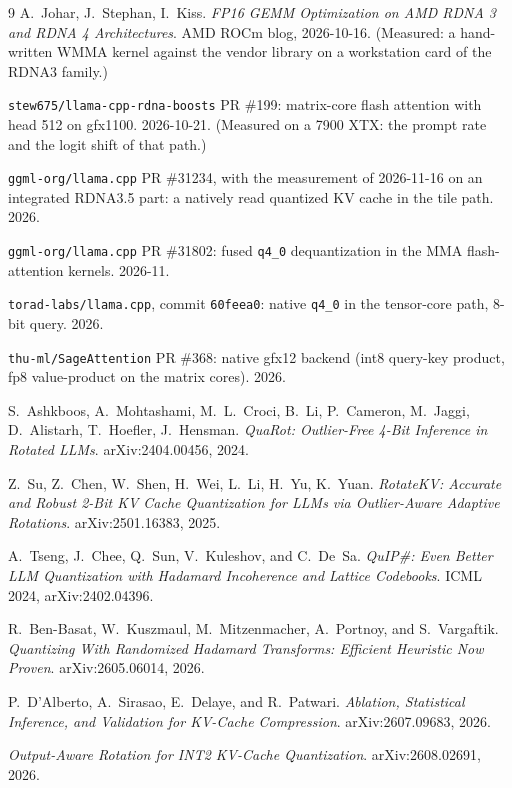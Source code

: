 \documentclass[10pt,twocolumn]{article}
\begin{document}
\begin{thebibliography}{9}
A.~Johar, J.~Stephan, I.~Kiss.
\emph{FP16 GEMM Optimization on AMD RDNA 3 and RDNA 4 Architectures}.
AMD ROCm blog, 2026-10-16. (Measured: a hand-written WMMA kernel against the vendor library on a
workstation card of the RDNA3 family.)

\texttt{stew675/llama-cpp-rdna-boosts} PR \#199: matrix-core flash attention with head 512 on gfx1100.
2026-10-21. (Measured on a 7900 XTX: the prompt rate and the logit shift of that path.)

\texttt{ggml-org/llama.cpp} PR \#31234, with the measurement of 2026-11-16 on an integrated RDNA3.5 part:
a natively read quantized KV cache in the tile path. 2026.


\texttt{ggml-org/llama.cpp} PR \#31802: fused \texttt{q4\_0} dequantization in the MMA
flash-attention kernels. 2026-11.

\texttt{torad-labs/llama.cpp}, commit \texttt{60feea0}: native \texttt{q4\_0} in the
tensor-core path, 8-bit query. 2026.

\texttt{thu-ml/SageAttention} PR \#368: native gfx12 backend (int8 query-key product,
fp8 value-product on the matrix cores). 2026.

S.~Ashkboos, A.~Mohtashami, M.~L.~Croci, B.~Li, P.~Cameron, M.~Jaggi, D.~Alistarh, T.~Hoefler, J.~Hensman.
\emph{QuaRot: Outlier-Free 4-Bit Inference in Rotated LLMs}.
arXiv:2404.00456, 2024.

Z.~Su, Z.~Chen, W.~Shen, H.~Wei, L.~Li, H.~Yu, K.~Yuan.
\emph{RotateKV: Accurate and Robust 2-Bit KV Cache Quantization for LLMs via Outlier-Aware Adaptive Rotations}.
arXiv:2501.16383, 2025.

A.~Tseng, J.~Chee, Q.~Sun, V.~Kuleshov, and C.~De~Sa.
\emph{QuIP\#: Even Better LLM Quantization with Hadamard Incoherence and Lattice Codebooks}.
ICML 2024, arXiv:2402.04396.

R.~Ben-Basat, W.~Kuszmaul, M.~Mitzenmacher, A.~Portnoy, and S.~Vargaftik.
\emph{Quantizing With Randomized Hadamard Transforms: Efficient Heuristic Now Proven}.
arXiv:2605.06014, 2026.

P.~D'Alberto, A.~Sirasao, E.~Delaye, and R.~Patwari.
\emph{Ablation, Statistical Inference, and Validation for KV-Cache Compression}.
arXiv:2607.09683, 2026.

\emph{Output-Aware Rotation for INT2 KV-Cache Quantization}.
arXiv:2608.02691, 2026.


\end{thebibliography}
\end{document}
